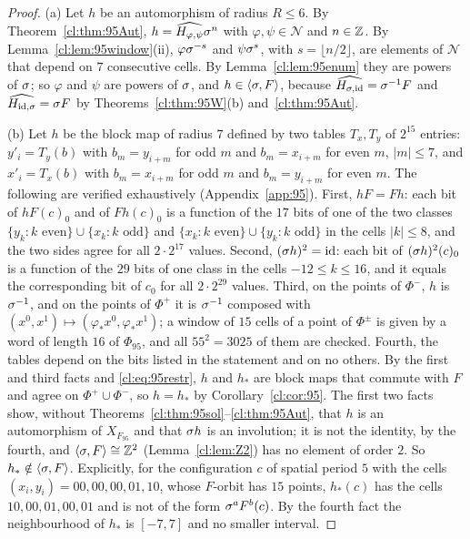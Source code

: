 \begin{proof}
(a) Let $h$ be an automorphism of radius $R\le6$. By Theorem~\ref{cl:thm:95Aut}, $h=\widehat{H_{\varphi,\psi}}\sigma^n$ with $\varphi,\psi\in\mathcal N$ and $n\in\mathbb{Z}$. By Lemma~\ref{cl:lem:95window}(ii), $\varphi\sigma^{-s}$ and $\psi\sigma^{s}$, with $s=\lfloor n/2\rfloor$, are elements of $\mathcal N$ that depend on $7$ consecutive cells. By Lemma~\ref{cl:lem:95enum} they are powers of $\sigma$; so $\varphi$ and $\psi$ are powers of $\sigma$, and $h\in\langle\sigma,F\rangle$, because $\widehat{H_{\sigma,\mathrm{id}}}=\sigma^{-1}F$ and $\widehat{H_{\mathrm{id},\sigma}}=\sigma F$ by Theorems~\ref{cl:thm:95W}(b) and~\ref{cl:thm:95Aut}.

(b) Let $h$ be the block map of radius $7$ defined by two tables $T_x,T_y$ of $2^{15}$ entries: $y'_i=T_y(b)$ with $b_m=y_{i+m}$ for odd $m$ and $b_m=x_{i+m}$ for even $m$, $|m|\le7$, and $x'_i=T_x(b)$ with $b_m=x_{i+m}$ for odd $m$ and $b_m=y_{i+m}$ for even $m$. The following are verified exhaustively (Appendix~\ref{app:95}). First, $hF=Fh$: each bit of $hF(c)_0$ and of $Fh(c)_0$ is a function of the $17$ bits of one of the two classes $\{y_k:k\text{ even}\}\cup\{x_k:k\text{ odd}\}$ and $\{x_k:k\text{ even}\}\cup\{y_k:k\text{ odd}\}$ in the cells $|k|\le8$, and the two sides agree for all $2\cdot2^{17}$ values. Second, $(\sigma h)^2=\mathrm{id}$: each bit of $(\sigma h)^2(c)_0$ is a function of the $29$ bits of one class in the cells $-12\le k\le16$, and it equals the corresponding bit of $c_0$ for all $2\cdot2^{29}$ values. Third, on the points of $\Phi^-$, $h$ is $\sigma^{-1}$, and on the points of $\Phi^+$ it is $\sigma^{-1}$ composed with $(x^0,x^1)\mapsto(\varphi_{\ast}x^0,\varphi_{\ast}x^1)$; a window of $15$ cells of a point of $\Phi^\pm$ is given by a word of length $16$ of $\Phi_{95}$, and all $55^2=3025$ of them are checked. Fourth, the tables depend on the bits listed in the statement and on no others. By the first and third facts and \eqref{cl:eq:95restr}, $h$ and $h_{\ast}$ are block maps that commute with $F$ and agree on $\Phi^+\cup\Phi^-$, so $h=h_{\ast}$ by Corollary~\ref{cl:cor:95}. The first two facts show, without Theorems~\ref{cl:thm:95sol}--\ref{cl:thm:95Aut}, that $h$ is an automorphism of $X_{F_{95}}$ and that $\sigma h$ is an involution; it is not the identity, by the fourth, and $\langle\sigma,F\rangle\cong\mathbb{Z}^2$ (Lemma~\ref{cl:lem:Z2}) has no element of order $2$. So $h_{\ast}\notin\langle\sigma,F\rangle$. Explicitly, for the configuration $c$ of spatial period $5$ with the cells $(x_i,y_i)=00,00,00,01,10$, whose $F$-orbit has $15$ points, $h_{\ast}(c)$ has the cells $10,00,01,00,01$ and is not of the form $\sigma^aF^b(c)$. By the fourth fact the neighbourhood of $h_{\ast}$ is $[-7,7]$ and no smaller interval.


\end{proof}
